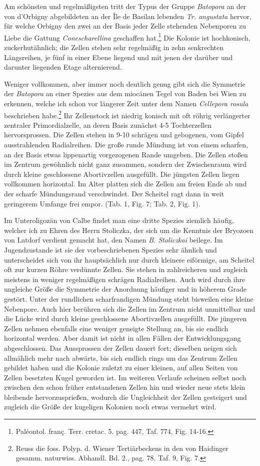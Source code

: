 \documentclass[a4paper, 11pt, oneside, german]{article}
\begin{document}
Am schönsten und regelmäßigsten tritt der Typus der Gruppe \emph{Batopora} an der von d'Orbigny abgebildeten an der Île de Basilan lebenden \emph{Tr. angustata} hervor, für welche Orbigny den zwei an der Basis jeder Zelle stehenden Nebenporen zu Liebe die Gattung \emph{Conescharellina} geschaffen hat.\footnote{Paléontol. franç. Terr. cretac. 5. pag. 447, Taf. 774, Fig. 14-16.} Die Kolonie ist hochkonisch, zuckerhutähnlich; die Zellen stehen sehr regelmäßig in zehn senkrechten Längsreihen, je fünf in einer Ebene liegend und mit jenen der darüber und darunter liegenden Etage alternierend.

Weniger vollkommen, aber immer noch deutlich genug gibt sich die Symmetrie der \emph{Batopora} an einer Spezies aus dem miocänen Tegel von Baden bei Wien zu erkennen, welche ich schon vor längerer Zeit unter dem Namen \emph{Cellepora rosula} beschrieben habe.\footnote{Reuss die foss. Polyp. d. Wiener Tertiärbeckens in den von Haidinger gesamm. naturwiss. Abhandl. Bd. 2., pag. 78. Taf. 9, Fig. 7.} Ihr Zellenstock ist niedrig konisch mit oft röhrig verlängerter zentraler Primordialzelle, an deren Basis zunächst 4-5 Tochterzellen hervorsprossen. Die Zellen stehen in 9-10 schrägen und gebogenen, vom Gipfel ausstrahlenden Radialreihen. Die große runde Mündung ist von einem scharfen, an der Basis etwas lippenartig vorgezogenen Rande umgeben. Die Zellen stoßen im Zentrum gewöhnlich nicht ganz zusammen, sondern der Zwischenraum wird durch kleine geschlossene Abortivzellen ausgefüllt. Die jüngsten Zellen liegen vollkommen horizontal. Im Alter platten sich die Zellen am freien Ende ab und der scharfe Mündungsrand verschwindet. Der Scheitel ragt dann in weit geringerem Umfange frei empor. (Tab. 1, Fig. 7; Tab. 2, Fig. 1).

Im Unteroligozän von Calbe findet man eine dritte Spezies ziemlich häufig, welcher ich zu Ehren des Herrn Stoliczka, der sich um die Kenntnis der Bryozoen von Latdorf verdient gemacht hat, den Namen \emph{B. Stoliczkai} beilege. Im Jugendzustande ist sie der vorbeschriebenen Spezies sehr ähnlich und unterscheidet sich von ihr hauptsächlich nur durch kleinere eiförmige, am Scheitel oft zur kurzen Röhre verdünnte Zellen. Sie stehen in zahlreicheren und zugleich meistens in weniger regelmäßigen schrägen Radialreihen. Auch wird durch ihre ungleiche Größe die Symmetrie der Anordnung häufiger und in höherem Grade gestört. Unter der rundlichen scharfrandigen Mündung steht bisweilen eine kleine Nebenpore. Auch hier berühren sich die Zellen im Zentrum nicht unmittelbar und die Lücke wird durch kleine geschlossene Abortivzellen ausgefüllt. Die jüngeren Zellen nehmen ebenfalls eine weniger geneigte Stellung an, bis sie endlich horizontal werden. Aber damit ist nicht in allen Fällen der Entwicklungsgang abgeschlossen. Das Aussprossen der Zellen dauert fort; dieselben neigen sich allmählich mehr nach abwärts, bis sich endlich rings um das Zentrum Zellen gebildet haben und die Kolonie zuletzt zu einer kleinen, auf allen Seiten von Zellen besetzten Kugel geworden ist. Im weiteren Verlaufe scheinen selbst noch zwischen den schon früher entstandenen Zellen hin und wieder neue stets klein bleibende hervorzusprießen, wodurch die Ungleichheit der Zellen gesteigert und zugleich die Größe der kugeligen Kolonien noch etwas vermehrt wird.
\end{document}
